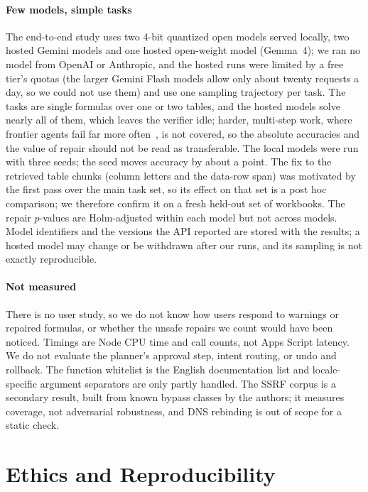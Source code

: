 \paragraph{Few models, simple tasks}
The end-to-end study uses two 4-bit quantized open models served locally, two hosted Gemini models and one hosted open-weight model (Gemma~4); we ran no model from OpenAI or Anthropic, and the hosted runs were limited by a free tier's quotas (the larger Gemini Flash models allow only about twenty requests a day, so we could not use them) and use one sampling trajectory per task. The tasks are single formulas over one or two tables, and the hosted models solve nearly all of them, which leaves the verifier idle; harder, multi-step work, where frontier agents fail far more often~\cite{zhu2026spreadsheetbench2}, is not covered, so the absolute accuracies and the value of repair should not be read as transferable. The local models were run with three seeds; the seed moves accuracy by about a point. The fix to the retrieved table chunks (column letters and the data-row span) was motivated by the first pass over the main task set, so its effect on that set is a post hoc comparison; we therefore confirm it on a fresh held-out set of workbooks. The repair $p$-values are Holm-adjusted within each model but not across models. Model identifiers and the versions the API reported are stored with the results; a hosted model may change or be withdrawn after our runs, and its sampling is not exactly reproducible.

\paragraph{Not measured}
There is no user study, so we do not know how users respond to warnings or repaired formulas, or whether the unsafe repairs we count would have been noticed. Timings are Node CPU time and  call counts, not Apps Script latency. We do not evaluate the planner's approval step, intent routing, or undo and rollback. The function whitelist is the English documentation list and locale-specific argument separators are only partly handled. The SSRF corpus is a secondary result, built from known bypass classes by the authors; it measures coverage, not adversarial robustness, and DNS rebinding is out of scope for a static check.

\section{Ethics and Reproducibility}
